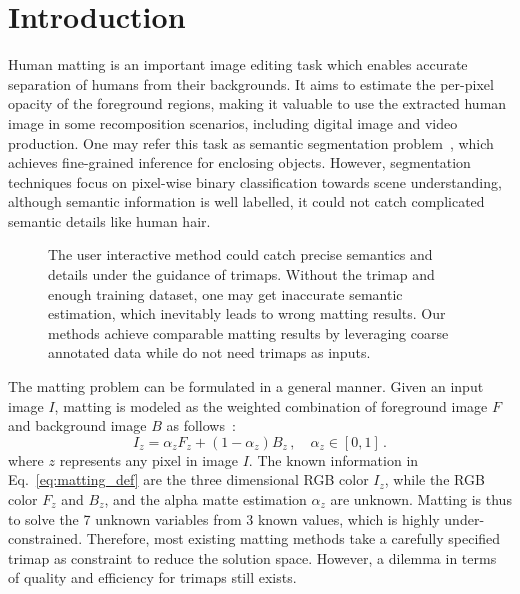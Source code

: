 \documentclass[10pt,twocolumn,letterpaper]{article}
\begin{document}
\section{Introduction}

Human matting is an important image editing task which enables accurate separation of humans from their backgrounds. It aims to estimate the per-pixel opacity of the foreground regions, making it valuable to use the extracted human image in some recomposition scenarios, including digital image and video production. One may refer this task as semantic segmentation problem~\cite{badrinarayanan2017segnet,chen2017rethinking,long2015fully}, which achieves fine-grained inference for enclosing objects. However, segmentation techniques focus on pixel-wise binary classification towards scene understanding, although semantic information is well labelled, it could not catch complicated semantic details like human hair.

\begin{figure}[t]
  \centering
  \caption{The user interactive method could catch precise semantics and details under the guidance of trimaps. Without the trimap and enough training dataset, one may get inaccurate semantic estimation, which inevitably leads to wrong matting results. Our methods achieve comparable matting results by leveraging coarse annotated data while do not need trimaps as inputs.}
  \label{fig: motivation}
\end{figure}

The matting problem can be formulated in a general manner. Given an input image $I$, matting is modeled as the weighted combination of foreground image $F$ and background image $B$ as follows~\cite{wang2008image}:
\begin{equation}
\label{eq:matting_def}
I_{z} = \alpha_{z}F_{z} + (1 - \alpha_{z})B_{z}\,, \quad \alpha_{z} \in [0,1]\,.
\end{equation}
where $z$ represents any pixel in image $I$. The known information in Eq.~\ref{eq:matting_def} are the three dimensional RGB color $I_{z}$, while the RGB color $F_{z}$ and $B_{z}$, and the alpha matte estimation $\alpha_{z}$ are unknown. Matting is thus to solve the 7 unknown variables from 3 known values, which is highly under-constrained. Therefore, most existing matting methods take a carefully specified trimap as constraint to reduce the solution space. However, a dilemma in terms of quality and efficiency for trimaps still exists.
\end{document}
